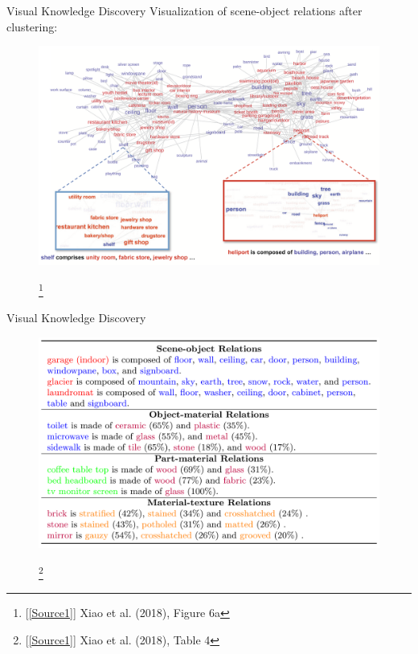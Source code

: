 \documentclass{beamer}
\newcommand\blfootnote[1]{
  \begingroup
  \renewcommand\thefootnote{}\footnote{#1}
  \addtocounter{footnote}{-1}
  \endgroup
}
\begin{document}
\begin{frame}{Visual Knowledge Discovery}
  Visualization of scene-object relations after clustering:
  \vspace{-0.25cm}
  \begin{figure}
    \centering
    \includegraphics[width=\textwidth]{Images/Figure6a.png}
    \blfootnote{[\ref{Source1}] Xiao et al. (2018), Figure 6a}
  \end{figure}
  \vspace{-1cm}
\end{frame}

\begin{frame}{Visual Knowledge Discovery}
  \begin{figure}
    \centering
    \includegraphics[width=\textwidth]{Images/Table4.png}
    \blfootnote{[\ref{Source1}] Xiao et al. (2018), Table 4}
  \end{figure}
\end{frame}
\end{document}
